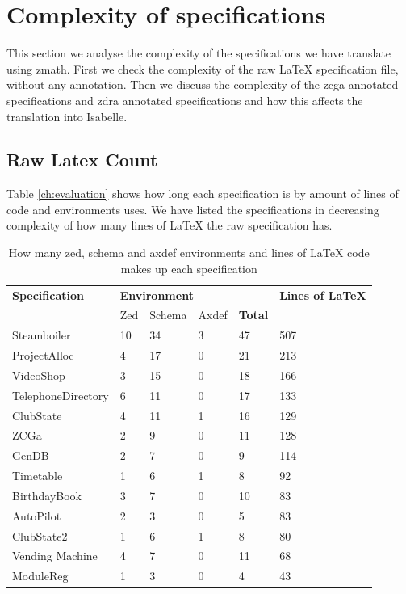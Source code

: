 \section{Complexity of specifications}

This section we analyse the complexity of the specifications we have translate
using \gls{zmath}. First we check the complexity of the raw \LaTeX{}
specification file, without any annotation. Then we discuss the complexity of
the \gls{zcga} annotated specifications and \gls{zdra} annotated specifications
and how this affects the translation into Isabelle.

\subsection{Raw Latex Count}

Table \ref{ch:evaluation} shows how long each specification is by amount of lines of
code and environments uses. We have listed the specifications in decreasing
complexity of how many lines of \LaTeX{} the raw specification has.

\begin{table}[H]
\centering
\begin{tabular}{|l |l | l |l |l|| l|}
\hline
\textbf{Specification} & \multicolumn{4}{l||}{\textbf{Environment}} &
\textbf{Lines of \LaTeX} \\
\cline{2-5}
& Zed & Schema & Axdef & \textbf{Total} & \\
\hline
Steamboiler & 10 & 34 & 3 & 47 & 507 \\
ProjectAlloc & 4 & 17 & 0 & 21 & 213 \\
VideoShop & 3 & 15 & 0 & 18 & 166 \\
TelephoneDirectory & 6 & 11 & 0 & 17& 133 \\
ClubState & 4 & 11 & 1 & 16 &129 \\
ZCGa & 2 & 9 & 0 & 11 & 128 \\
GenDB & 2 & 7 & 0 & 9 & 114 \\
Timetable & 1 & 6 & 1 & 8 & 92 \\
BirthdayBook & 3 & 7 & 0 & 10 & 83 \\
AutoPilot & 2 & 3 & 0 & 5 & 83 \\
ClubState2 & 1 & 6 & 1 & 8 & 80 \\
Vending Machine & 4 & 7 & 0 & 11 & 68 \\
ModuleReg & 1 & 3 & 0 & 4 & 43 \\
\hline
\end{tabular}
\caption{How many zed, schema and axdef environments and lines of \LaTeX{} code makes up each specification \label{tab:numbersspec}}
\end{table}

